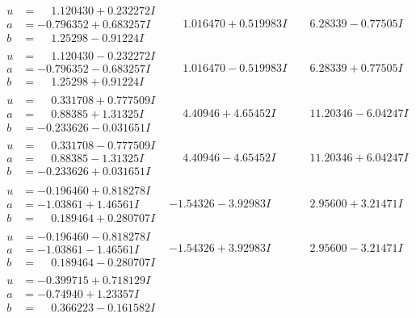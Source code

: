 \documentclass[1p]{elsarticle_modified}
\theoremstyle{definition}
\begin{document}
$$\begin{array}{c|c|c}
\begin{aligned}
u &= \phantom{-}1.120430 + 0.232272 I \\
a &= -0.796352 + 0.683257 I \\
b &= \phantom{-}1.25298 - 0.91224 I\end{aligned}
 & \phantom{-}1.016470 + 0.519983 I & \phantom{-}6.28339 - 0.77505 I \\ \hline\begin{aligned}
u &= \phantom{-}1.120430 - 0.232272 I \\
a &= -0.796352 - 0.683257 I \\
b &= \phantom{-}1.25298 + 0.91224 I\end{aligned}
 & \phantom{-}1.016470 - 0.519983 I & \phantom{-}6.28339 + 0.77505 I \\ \hline\begin{aligned}
u &= \phantom{-}0.331708 + 0.777509 I \\
a &= \phantom{-}0.88385 + 1.31325 I \\
b &= -0.233626 - 0.031651 I\end{aligned}
 & \phantom{-}4.40946 + 4.65452 I & \phantom{-}11.20346 - 6.04247 I \\ \hline\begin{aligned}
u &= \phantom{-}0.331708 - 0.777509 I \\
a &= \phantom{-}0.88385 - 1.31325 I \\
b &= -0.233626 + 0.031651 I\end{aligned}
 & \phantom{-}4.40946 - 4.65452 I & \phantom{-}11.20346 + 6.04247 I \\ \hline\begin{aligned}
u &= -0.196460 + 0.818278 I \\
a &= -1.03861 + 1.46561 I \\
b &= \phantom{-}0.189464 + 0.280707 I\end{aligned}
 & -1.54326 - 3.92983 I & \phantom{-}2.95600 + 3.21471 I \\ \hline\begin{aligned}
u &= -0.196460 - 0.818278 I \\
a &= -1.03861 - 1.46561 I \\
b &= \phantom{-}0.189464 - 0.280707 I\end{aligned}
 & -1.54326 + 3.92983 I & \phantom{-}2.95600 - 3.21471 I \\ \hline\begin{aligned}
u &= -0.399715 + 0.718129 I \\
a &= -0.74940 + 1.23357 I \\
b &= \phantom{-}0.366223 - 0.161582 I\end{aligned}

\end{array}$$
\end{document}
